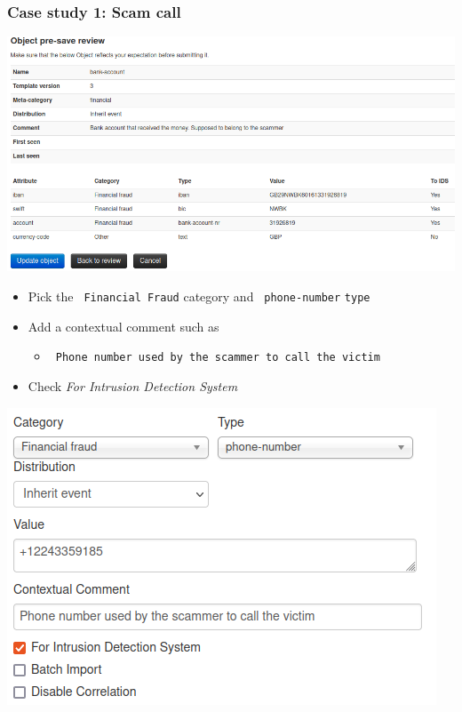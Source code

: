 \begin{frame}
    \frametitle{Case study 1: Scam call}
    \begin{center}
        \includegraphics[width=1.0\linewidth]{pictures/case1/object-bankaccount.png}
    \end{center}
\end{frame}

\begin{frame}
    \begin{itemize}
        \item Pick the \texttt{\color{black} Financial Fraud} category and \texttt{\color{black} phone-number} \texttt{type}
        \item Add a contextual comment such as
        \begin{itemize}
            \item \texttt{\color{black} Phone number used by the scammer to call the victim}
        \end{itemize}
        \item Check \textit{\color{black} For Intrusion Detection System}
    \end{itemize}
    \begin{center}
        \includegraphics[width=0.55\linewidth]{pictures/case1/attribute-phone.png}
    \end{center}
\end{frame}

